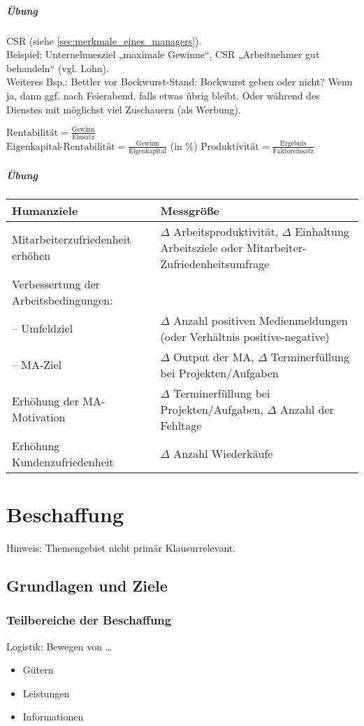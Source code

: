 \paragraph{Übung} CSR (siehe \ref{sec:merkmale_eines_managers}). \\
Beispiel: Unternehmesziel „maximale Gewinne“, CSR „Arbeitnehmer gut behandeln“ (vgl. Lohn).\\
Weiteres Bsp.: Bettler vor Bockwurst-Stand: Bockwurst geben oder nicht? Wenn ja, dann ggf. nach Feierabend, falls etwas übrig bleibt. Oder während des Dienstes mit möglichst viel Zuschauern (als Werbung).

$\text{Rentabilität} = \frac{\text{Gewinn}}{\text{Einsatz}}$\\
$\text{Eigenkapital-Rentabilität} = \frac{\text{Gewinn}}{\text{Eigenkapital}}$ (in \%)
$\text{Produktivität} = \frac{\text{Ergebnis}}{\text{Faktoreinsatz}}$
\paragraph{Übung}\parskp
\begin{tabular}{L{0.3} L{0.7}}
Humanziele & Messgröße\tabularnewline
\hline
Mitarbeiterzufriedenheit erhöhen & $\Delta$ Arbeitsproduktivität, $\Delta$ Einhaltung Arbeitsziele oder Mitarbeiter-Zufriedenheitsumfrage\tabularnewline
Verbessertung der Arbeitsbedingungen: & \tabularnewline
-- Umfeldziel & $\Delta$ Anzahl positiven Medienmeldungen (oder Verhältnis positive-negative)\tabularnewline
-- MA-Ziel & $\Delta$ Output der MA, $\Delta$ Terminerfüllung bei Projekten/Aufgaben \tabularnewline
Erhöhung der MA-Motivation & $\Delta$ Terminerfüllung bei Projekten/Aufgaben, $\Delta$ Anzahl der Fehltage \tabularnewline
Erhöhung Kundenzufriedenheit & $\Delta$ Anzahl Wiederkäufe \tabularnewline
\end{tabular}

\chapter{Beschaffung}
Hinweis: Themengebiet nicht primär Klausurrelevant.
\section{Grundlagen und Ziele}
\subsection{Teilbereiche der Beschaffung}
Logistik: Bewegen von …
\begin{itemize}
\item Gütern
\item Leistungen
\item Informationen
\end{itemize}
